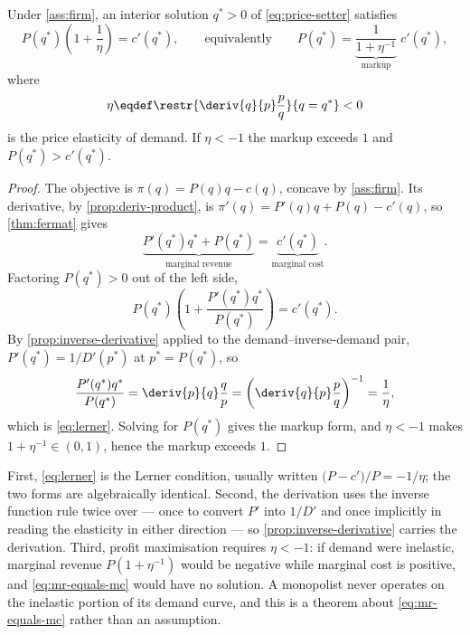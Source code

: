 \begin{proposition}\label{prop:markup}
	Under \autoref{ass:firm}, an interior solution $q^\ast>0$ of
	\eqref{eq:price-setter} satisfies
	\begin{equation}\label{eq:lerner}
		P(q^\ast)\left(1+\frac{1}{\eta}\right)=c'(q^\ast),
		\qquad\text{equivalently}\qquad
		P(q^\ast)=\underbrace{\frac{1}{1+\eta^{-1}}}_{\text{markup}}\;c'(q^\ast),
	\end{equation}
	where
	\[
		\eta\eqdef\restr{\deriv{q}{p}\frac{p}{q}}{q=q^\ast}<0
	\]
	is the price elasticity of demand. If $\eta<-1$ the markup exceeds $1$ and
	$P(q^\ast)>c'(q^\ast)$.
\end{proposition}

\begin{proof}
	The objective is $\pi(q)=P(q)q-c(q)$, concave by \autoref{ass:firm}. Its
	derivative, by \autoref{prop:deriv-product}, is
	$\pi'(q)=P'(q)q+P(q)-c'(q)$, so \autoref{thm:fermat} gives
	\begin{equation}\label{eq:mr-equals-mc}
		\underbrace{P'(q^\ast)q^\ast+P(q^\ast)}_{\text{marginal revenue}}
		=\underbrace{c'(q^\ast)}_{\text{marginal cost}} .
	\end{equation}
	Factoring $P(q^\ast)>0$ out of the left side,
	\[
		P(q^\ast)\left(1+\frac{P'(q^\ast)q^\ast}{P(q^\ast)}\right)=c'(q^\ast).
	\]
	By \autoref{prop:inverse-derivative} applied to the demand--inverse-demand
	pair, $P'(q^\ast)=1/D'(p^\ast)$ at $p^\ast=P(q^\ast)$, so
	\[
		\frac{P'(q^\ast)q^\ast}{P(q^\ast)}
		=\deriv{p}{q}\frac{q}{p}
		=\left(\deriv{q}{p}\frac{p}{q}\right)^{-1}=\frac{1}{\eta},
	\]
	which is \eqref{eq:lerner}. Solving for $P(q^\ast)$ gives the markup form, and
	$\eta<-1$ makes $1+\eta^{-1}\in(0,1)$, hence the markup exceeds $1$.
\end{proof}

First, \eqref{eq:lerner} is the Lerner condition, usually
written $\bigl(P-c'\bigr)/P=-1/\eta$; the two forms are algebraically identical.
Second, the derivation uses the inverse function rule twice over --- once to
convert $P'$ into $1/D'$ and once implicitly in reading the elasticity in either
direction --- so \autoref{prop:inverse-derivative} carries the derivation. Third, profit maximisation requires $\eta<-1$: if demand were
inelastic, marginal revenue $P(1+\eta^{-1})$ would be negative while marginal
cost is positive, and \eqref{eq:mr-equals-mc} would have no solution. A monopolist
never operates on the inelastic portion of its demand curve, and this is a
theorem about \eqref{eq:mr-equals-mc} rather than an assumption.

